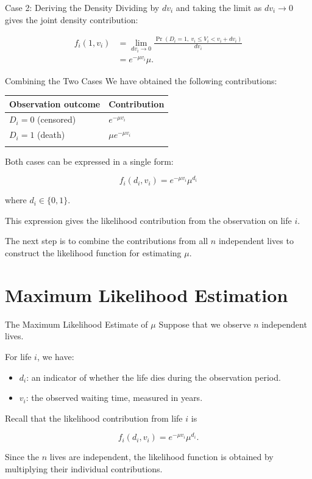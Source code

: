 \documentclass[
  ignorenonframetext,
  aspectratio=169,
]{beamer}
\newcounter{none} %
\providecommand{\tightlist}{%
  \setlength{\itemsep}{0pt}\setlength{\parskip}{0pt}}
\begin{document}
\begin{frame}{Case 2: Deriving the Density}
\protect{}\label{case-2-deriving-the-density-1}
Dividing by \(dv_i\) and taking the limit as \(dv_i\to 0\) gives the
joint density contribution:

\[
\begin{aligned}
f_i(1,v_i)
&=\lim_{dv_i\to0}
\frac{
\Pr(D_i=1,\ v_i\leq V_i<v_i+dv_i)
}{dv_i}\\
&=e^{-\mu v_i}\mu.
\end{aligned}
\]
\end{frame}

\begin{frame}{Combining the Two Cases}
\protect{}\label{combining-the-two-cases}
We have obtained the following contributions:

{\def\LTcaptype{none} %
\begin{longtable}[]{@{}ll@{}}
\toprule\noalign{}
Observation outcome & Contribution \\
\midrule\noalign{}
\endhead
\(D_i=0\) (censored) & \(e^{-\mu v_i}\) \\
\(D_i=1\) (death) & \(\mu e^{-\mu v_i}\) \\
\bottomrule\noalign{}
\end{longtable}
}

Both cases can be expressed in a single form:

\[
\boxed{
f_i(d_i,v_i)
=
e^{-\mu v_i}\mu^{d_i}
}
\]

where \(d_i\in\{0,1\}\).

This expression gives the likelihood contribution from the observation
on life \(i\).

The next step is to combine the contributions from all \(n\) independent
lives to construct the likelihood function for estimating \(\mu\).
\end{frame}

\section{Maximum Likelihood
Estimation}\label{maximum-likelihood-estimation}

\begin{frame}{The Maximum Likelihood Estimate of \(\mu\)}
\protect{}\label{the-maximum-likelihood-estimate-of-mu}
Suppose that we observe \(n\) independent lives.

For life \(i\), we have:

\begin{itemize}
\tightlist
\item
  \(d_i\): an indicator of whether the life dies during the observation
  period.
\item
  \(v_i\): the observed waiting time, measured in years.
\end{itemize}

Recall that the likelihood contribution from life \(i\) is

\[
f_i(d_i,v_i)=e^{-\mu v_i}\mu^{d_i}.
\]

Since the \(n\) lives are independent, the likelihood function is
obtained by multiplying their individual contributions.
\end{frame}
\end{document}
